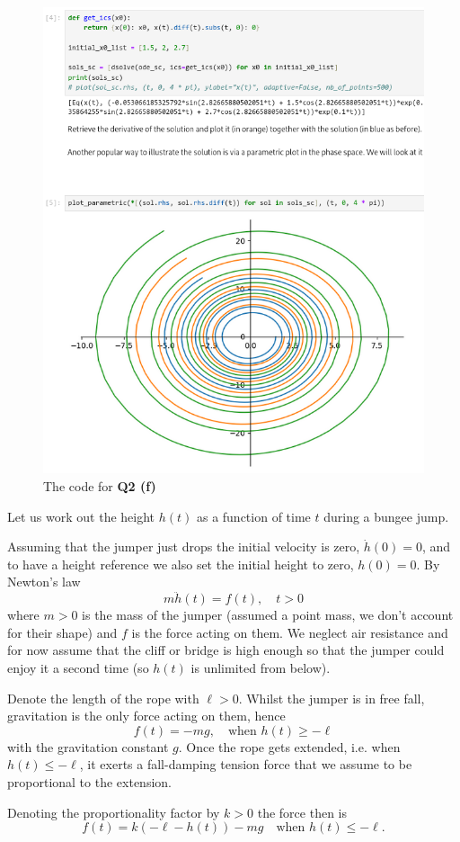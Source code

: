\documentclass[a4paper]{article}
\begin{document}
\begin{figure}[hbtp]
	\centering
	\includegraphics[width=\linewidth]{Q2-f}
	\caption{The code for \textbf{Q2 (f)}}
\end{figure}



\begin{questionbody}
Let us work out the height $h(t)$ as a function of time $t$ during a bungee jump.

Assuming that the jumper just drops the initial velocity is zero, $\dot h(0) = 0$, and to have a height reference we also set the initial height to zero, $h(0) = 0$. By Newton’s law \[
m \ddot h(t) = f(t), \quad t > 0
\] where $m > 0$ is the mass of the jumper (assumed a point mass, we don’t account for their shape) and $f$ is the force acting on them. We neglect air resistance and for now assume that the cliff or bridge is high enough so that the jumper could enjoy it a second time (so $h(t)$ is unlimited from below).

Denote the length of the rope with $\ell > 0$. Whilst the jumper is in free fall, gravitation is the only force acting on them, hence \[
f(t) = -mg, \quad \text{when } h(t) \ge -\ell
\] with the gravitation constant $g$. Once the rope gets extended, i.e. when $h(t) \le -\ell$, it exerts a fall-damping tension force that we assume to be proportional to the extension.

Denoting the proportionality factor by $k > 0$ the force then is \[
f(t) = k(-\ell - h(t)) - mg \quad \text{when } h(t) \le -\ell.
\]
\end{questionbody}
\end{document}
